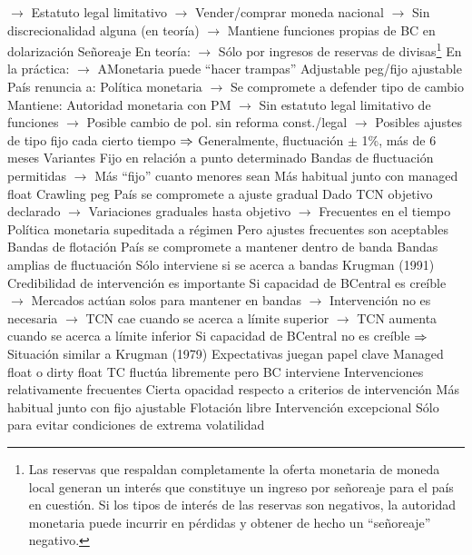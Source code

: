 \documentclass{nuevotema}
\begin{document}
\begin{esquemal}
				\4[] $\to$ Estatuto legal limitativo
				\4[] $\to$ Vender/comprar moneda nacional 
				\4[] $\to$ Sin discrecionalidad alguna (en teoría)
				\4[] $\to$ Mantiene funciones propias de BC en dolarización
				\4 Señoreaje
				\4[] En teoría:
				\4[] $\to$ Sólo por ingresos de reservas de divisas\footnote{Las reservas que respaldan completamente la oferta monetaria de moneda local generan un interés que constituye un ingreso por señoreaje para el país en cuestión. Si los tipos de interés de las reservas son negativos, la autoridad monetaria puede incurrir en pérdidas y obtener de hecho un ``señoreaje'' negativo.}
				\4[] En la práctica:
				\4[] $\to$ AMonetaria puede ``hacer trampas''
			\3 Adjustable peg/fijo ajustable
				\4 País renuncia a:
				\4[] Política monetaria
				\4[] $\to$ Se compromete a defender tipo de cambio
				\4 Mantiene:
				\4[] Autoridad monetaria con PM
				\4[] $\to$ Sin estatuto legal limitativo de funciones
				\4[] $\to$ Posible cambio de pol. sin reforma const./legal
				\4[] $\to$ Posibles ajustes de tipo fijo cada cierto tiempo
				\4[] $\then$ Generalmente, fluctuación $\pm$ 1\%, más de 6 meses
				\4 Variantes
				\4[] Fijo en relación a punto determinado
				\4[] Bandas de fluctuación permitidas
				\4[] $\to$ Más ``fijo'' cuanto menores sean
				\4 Más habitual junto con managed float
			\3 Crawling peg
				\4 País se compromete a ajuste gradual
				\4[] Dado TCN objetivo declarado
				\4[] $\to$ Variaciones graduales hasta objetivo
				\4[] $\to$ Frecuentes en el tiempo
				\4 Política monetaria supeditada a régimen
				\4[] Pero ajustes frecuentes son aceptables
			\3 Bandas de flotación
				\4 País se compromete a mantener dentro de banda
				\4 Bandas amplias de fluctuación
				\4[] Sólo interviene si se acerca a bandas
				\4 Krugman (1991)
				\4[] Credibilidad de intervención es importante
				\4[] Si capacidad de BCentral es creíble
				\4[] $\to$ Mercados actúan solos para mantener en bandas
				\4[] $\to$ Intervención no es necesaria
				\4[] $\to$ TCN cae cuando se acerca a límite superior
				\4[] $\to$ TCN aumenta cuando se acerca a límite inferior
				\4[] Si capacidad de BCentral no es creíble
				\4[] $\then$ Situación similar a Krugman (1979)
				\4[$\then$] Expectativas juegan papel clave
			\3 Managed float o dirty float
				\4 TC fluctúa libremente pero BC interviene
				\4 Intervenciones relativamente frecuentes
				\4 Cierta opacidad respecto a criterios de intervención
				\4 Más habitual junto con fijo ajustable
			\3 Flotación libre
				\4 Intervención excepcional
				\4 Sólo para evitar condiciones de extrema volatilidad

\end{esquemal}
\end{document}
